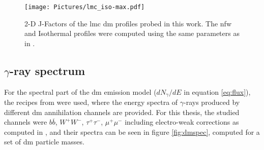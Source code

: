 \documentclass[main.tex]{subfiles}
\begin{document}
\begin{figure}
\endminipage
{}
\texttt{[image: Pictures/lmc\_iso-max.pdf]}
\endminipage
  \caption{2-D J-Factors of the \gls{lmc} \gls{dm} profiles probed in this work. The \gls{nfw} and Isothermal profiles were computed using the same parameters as in \cite{2015FermiLMCDM}.}
    \label{fig:jfactors}
\end{figure}

\subsection{$\gamma$-ray spectrum}

For the spectral part of the \gls{dm} emission model ($dN_{\gamma}/dE$ in equation \ref{eq:flux}), the recipes from \cite{2011cirelli} were used, where the energy spectra of $\gamma$-rays produced by different \gls{dm} annihilation channels are provided. For this thesis, the studied channels were $b \overline b$, $W^+ W^-$, $\tau^+\tau^-$, $\mu^+ \mu^-$ including electro-weak corrections as computed in \cite{2011EWcorrections}, and their spectra can be seen in figure \ref{fig:dmspec}, computed for a set of \gls{dm} particle masses.
\end{document}
